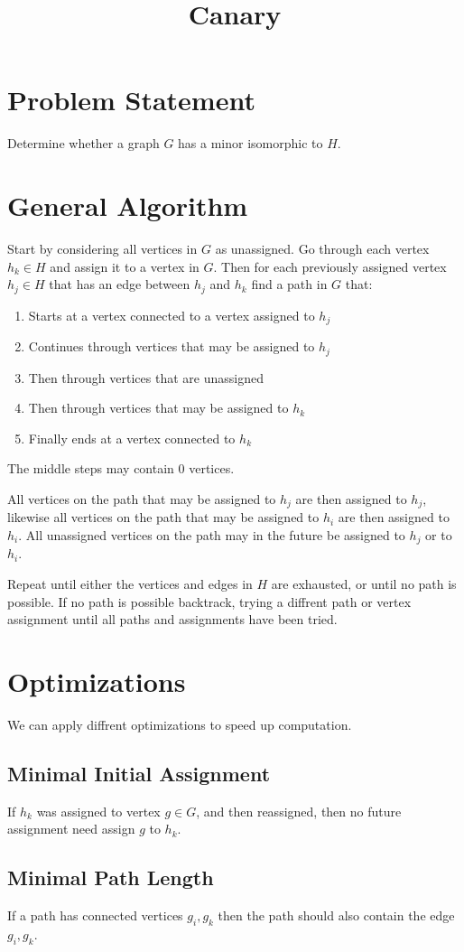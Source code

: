 \documentclass[11pt,twocolumn]{article}
\title{Canary}
\begin{document}
\maketitle

\section{Problem Statement}
Determine whether a graph $G$ has a minor isomorphic to $H$. 

\section{General Algorithm}
Start by considering all vertices in $G$ as unassigned.
Go through each vertex $h_k \in H$ and assign it to a vertex in $G$.
Then for each previously assigned vertex $h_j \in H$ that has an edge between $h_j$ and $h_k$ find a path in $G$ that:
\begin{enumerate}
\item Starts at a vertex connected to a vertex assigned to $h_j$
\item Continues through vertices that may be assigned to $h_j$
\item Then through vertices that are unassigned
\item Then through vertices that may be assigned to $h_k$
\item Finally ends at a vertex connected to $h_k$
\end{enumerate}
The middle steps may contain $0$ vertices.

All vertices on the path that may be assigned to $h_j$ are then assigned to $h_j$,
  likewise all vertices on the path that may be assigned to $h_i$ are then assigned to $h_i$.
All unassigned vertices on the path may in the future be assigned to $h_j$ or to $h_i$.

Repeat until either the vertices and edges in $H$ are exhausted, or until no path is possible.
If no path is possible backtrack, trying a diffrent path or vertex assignment until all paths and assignments have been tried.

\section{Optimizations}
We can apply diffrent optimizations to speed up computation.
\subsection{Minimal Initial Assignment}
If $h_k$ was assigned to vertex $g \in G$, and then reassigned, then no future assignment need assign $g$ to $h_k$.
\subsection{Minimal Path Length}
If a path has connected vertices $g_i, g_k$ then the path should also contain the edge $g_i, g_k$.


\nocite*{}
\end{document}
